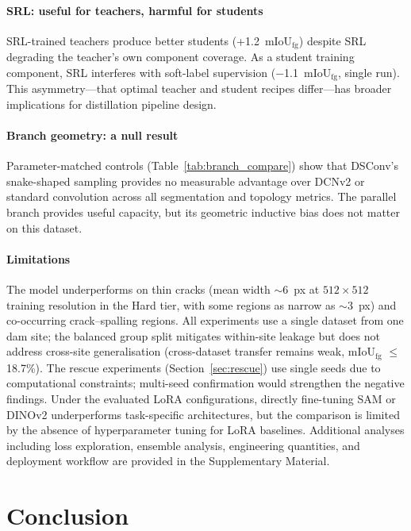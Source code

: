 \documentclass[review,authoryear]{elsarticle}
\begin{document}
\paragraph{SRL: useful for teachers, harmful for students}
SRL-trained teachers produce better students (+1.2~mIoU$_{\text{fg}}$) despite SRL degrading the teacher's own component coverage. As a student training component, SRL interferes with soft-label supervision ($-$1.1~mIoU$_{\text{fg}}$, single run). This asymmetry---that optimal teacher and student recipes differ---has broader implications for distillation pipeline design.

\paragraph{Branch geometry: a null result}
Parameter-matched controls (Table~\ref{tab:branch_compare}) show that DSConv's snake-shaped sampling provides no measurable advantage over DCNv2 or standard convolution across all segmentation and topology metrics.
The parallel branch provides useful capacity, but its geometric inductive bias does not matter on this dataset.

\paragraph{Limitations}
The model underperforms on thin cracks (mean width ${\sim}$6~px at $512{\times}512$ training resolution in the Hard tier, with some regions as narrow as ${\sim}$3~px) and co-occurring crack--spalling regions.
All experiments use a single dataset from one dam site; the balanced group split mitigates within-site leakage but does not address cross-site generalisation (cross-dataset transfer remains weak, mIoU$_{\text{fg}}$ $\leq$ 18.7\%).
The rescue experiments (Section~\ref{sec:rescue}) use single seeds due to computational constraints; multi-seed confirmation would strengthen the negative findings.
Under the evaluated LoRA configurations, directly fine-tuning SAM or DINOv2 underperforms task-specific architectures, but the comparison is limited by the absence of hyperparameter tuning for LoRA baselines.
Additional analyses including loss exploration, ensemble analysis, engineering quantities, and deployment workflow are provided in the Supplementary Material.

\section{Conclusion}
\label{sec:conclusion}
\end{document}
